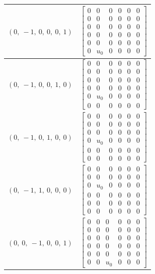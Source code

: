 \documentclass[11pt]{article}
\theoremstyle{definition}
\begin{document}
\begin{longtable}{|l|c|}
    \hline
    $\left( 0, \  -1, \  0, \  0, \  0, \  1\right)$ & ${\left[\begin{matrix}0 & 0 & 0 & 0 & 0 & 0\\0 & 0 & 0 & 0 & 0 & 0\\0 & 0 & 0 & 0 & 0 & 0\\0 & 0 & 0 & 0 & 0 & 0\\0 & 0 & 0 & 0 & 0 & 0\\0 & u_{0} & 0 & 0 & 0 & 0\end{matrix}\right]}$ \\
    \hline
    $\left( 0, \  -1, \  0, \  0, \  1, \  0\right)$ & ${\left[\begin{matrix}0 & 0 & 0 & 0 & 0 & 0\\0 & 0 & 0 & 0 & 0 & 0\\0 & 0 & 0 & 0 & 0 & 0\\0 & 0 & 0 & 0 & 0 & 0\\0 & u_{0} & 0 & 0 & 0 & 0\\0 & 0 & 0 & 0 & 0 & 0\end{matrix}\right]}$ \\
    \hline
    $\left( 0, \  -1, \  0, \  1, \  0, \  0\right)$ & ${\left[\begin{matrix}0 & 0 & 0 & 0 & 0 & 0\\0 & 0 & 0 & 0 & 0 & 0\\0 & 0 & 0 & 0 & 0 & 0\\0 & u_{0} & 0 & 0 & 0 & 0\\0 & 0 & 0 & 0 & 0 & 0\\0 & 0 & 0 & 0 & 0 & 0\end{matrix}\right]}$ \\
    \hline
    $\left( 0, \  -1, \  1, \  0, \  0, \  0\right)$ & ${\left[\begin{matrix}0 & 0 & 0 & 0 & 0 & 0\\0 & 0 & 0 & 0 & 0 & 0\\0 & u_{0} & 0 & 0 & 0 & 0\\0 & 0 & 0 & 0 & 0 & 0\\0 & 0 & 0 & 0 & 0 & 0\\0 & 0 & 0 & 0 & 0 & 0\end{matrix}\right]}$ \\
    \hline
    $\left( 0, \  0, \  -1, \  0, \  0, \  1\right)$ & ${\left[\begin{matrix}0 & 0 & 0 & 0 & 0 & 0\\0 & 0 & 0 & 0 & 0 & 0\\0 & 0 & 0 & 0 & 0 & 0\\0 & 0 & 0 & 0 & 0 & 0\\0 & 0 & 0 & 0 & 0 & 0\\0 & 0 & u_{0} & 0 & 0 & 0\end{matrix}\right]}$ \\

\end{longtable}
\end{document}
